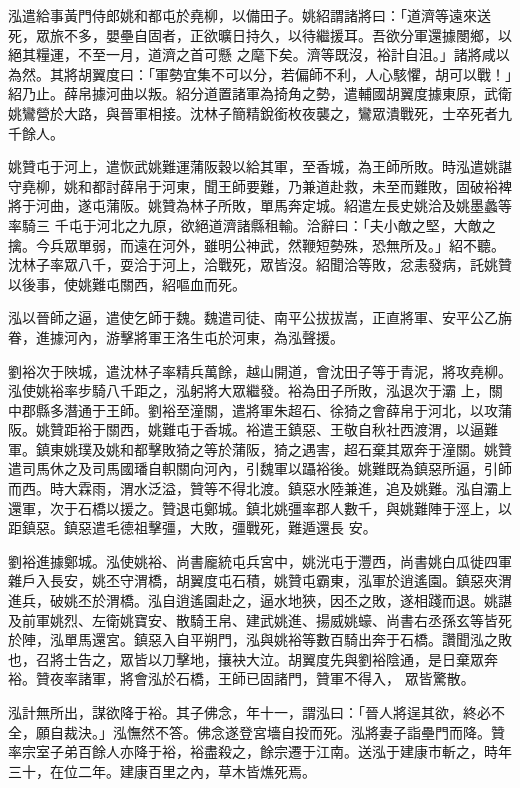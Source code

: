 \begin{pinyinscope}
 泓遣給事黃門侍郎姚和都屯於堯柳，以備田子。姚紹謂諸將曰：「道濟等遠來送死，眾旅不多，嬰壘自固者，正欲曠日持久，以待繼援耳。吾欲分軍還據閿鄉，以絕其糧運，不至一月，道濟之首可懸
 之麾下矣。濟等既沒，裕計自沮。」諸將咸以為然。其將胡翼度曰：「軍勢宜集不可以分，若偏師不利，人心駭懼，胡可以戰！」紹乃止。薛帛據河曲以叛。紹分道置諸軍為掎角之勢，遣輔國胡翼度據東原，武衛姚鸞營於大路，與晉軍相接。沈林子簡精銳銜枚夜襲之，鸞眾潰戰死，士卒死者九千餘人。



 姚贊屯于河上，遣恢武姚難運蒲阪穀以給其軍，至香城，為王師所敗。時泓遣姚諶守堯柳，姚和都討薛帛于河東，聞王師要難，乃兼道赴救，未至而難敗，固破裕裨將于河曲，遂屯蒲阪。姚贊為林子所敗，單馬奔定城。紹遣左長史姚洽及姚墨蠡等率騎三
 千屯于河北之九原，欲絕道濟諸縣租輸。洽辭曰：「夫小敵之堅，大敵之擒。今兵眾單弱，而遠在河外，雖明公神武，然鞭短勢殊，恐無所及。」紹不聽。沈林子率眾八千，耍洽于河上，洽戰死，眾皆沒。紹聞洽等敗，忿恚發病，託姚贊以後事，使姚難屯關西，紹嘔血而死。



 泓以晉師之逼，遣使乞師于魏。魏遣司徒、南平公拔拔嵩，正直將軍、安平公乙旃眷，進據河內，游擊將軍王洛生屯於河東，為泓聲援。



 劉裕次于陜城，遣沈林子率精兵萬餘，越山開道，會沈田子等于青泥，將攻堯柳。泓使姚裕率步騎八千距之，泓躬將大眾繼發。裕為田子所敗，泓退次于灞
 上，關中郡縣多潛通于王師。劉裕至潼關，遣將軍朱超石、徐猗之會薛帛于河北，以攻蒲阪。姚贊距裕于關西，姚難屯于香城。裕遣王鎮惡、王敬自秋社西渡渭，以逼難軍。鎮東姚璞及姚和都擊敗猗之等於蒲阪，猗之遇害，超石棄其眾奔于潼關。姚贊遣司馬休之及司馬國璠自軹關向河內，引魏軍以躡裕後。姚難既為鎮惡所逼，引師而西。時大霖雨，渭水泛溢，贊等不得北渡。鎮惡水陸兼進，追及姚難。泓自灞上還軍，次于石橋以援之。贊退屯鄭城。鎮北姚彊率郡人數千，與姚難陣于涇上，以距鎮惡。鎮惡遣毛德祖擊彊，大敗，彊戰死，難遁還長
 安。



 劉裕進據鄭城。泓使姚裕、尚書龐統屯兵宮中，姚洸屯于灃西，尚書姚白瓜徙四軍雜戶入長安，姚丕守渭橋，胡翼度屯石積，姚贊屯霸東，泓軍於逍遙園。鎮惡夾渭進兵，破姚丕於渭橋。泓自逍遙園赴之，逼水地狹，因丕之敗，遂相踐而退。姚諶及前軍姚烈、左衛姚寶安、散騎王帛、建武姚進、揚威姚蠔、尚書右丞孫玄等皆死於陣，泓單馬還宮。鎮惡入自平朔門，泓與姚裕等數百騎出奔于石橋。讚聞泓之敗也，召將士告之，眾皆以刀擊地，攘袂大泣。胡翼度先與劉裕陰通，是日棄眾奔裕。贊夜率諸軍，將會泓於石橋，王師已固諸門，贊軍不得入，
 眾皆驚散。



 泓計無所出，謀欲降于裕。其子佛念，年十一，謂泓曰：「晉人將逞其欲，終必不全，願自裁決。」泓憮然不答。佛念遂登宮墻自投而死。泓將妻子詣壘門而降。贊率宗室子弟百餘人亦降于裕，裕盡殺之，餘宗遷于江南。送泓于建康市斬之，時年三十，在位二年。建康百里之內，草木皆燋死焉。




\end{pinyinscope}
